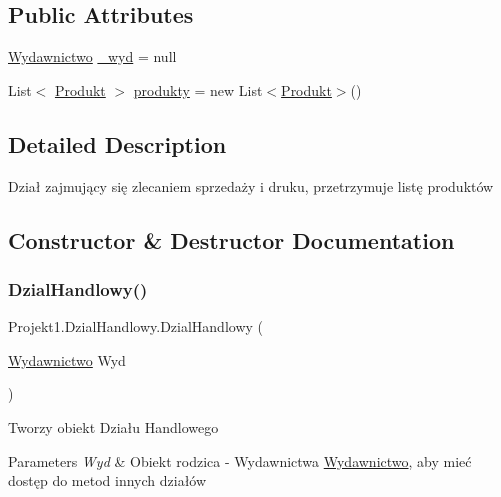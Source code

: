 \subsection*{Public Attributes}
\begin{DoxyCompactItemize}
\item 
\mbox{\hyperlink{class_projekt1_1_1_wydawnictwo}{Wydawnictwo}} \mbox{\hyperlink{class_projekt1_1_1_dzial_handlowy_a9fa7f63ee2ce0974a38f86cc1ef9c042}{\+\_\+wyd}} = null
\item 
List$<$ \mbox{\hyperlink{class_projekt1_1_1_produkt}{Produkt}} $>$ \mbox{\hyperlink{class_projekt1_1_1_dzial_handlowy_a72a83f1d777ad8acafc3e071d1fc64d7}{produkty}} = new List$<$\mbox{\hyperlink{class_projekt1_1_1_produkt}{Produkt}}$>$()
\end{DoxyCompactItemize}


\subsection{Detailed Description}
Dział zajmujący się zlecaniem sprzedaży i druku, przetrzymuje listę produktów 



\subsection{Constructor \& Destructor Documentation}
\mbox{\label{class_projekt1_1_1_dzial_handlowy_ad5c7110f56857cc32a3dfaf0811d72a4}} 
\subsubsection{\texorpdfstring{DzialHandlowy()}{DzialHandlowy()}}
{\footnotesize\ttfamily Projekt1.\+Dzial\+Handlowy.\+Dzial\+Handlowy (\begin{DoxyParamCaption}\item[{\mbox{\hyperlink{class_projekt1_1_1_wydawnictwo}{Wydawnictwo}}}]{Wyd }\end{DoxyParamCaption})}



Tworzy obiekt Działu Handlowego 


\begin{DoxyParams}{Parameters}
{\em Wyd} & Obiekt rodzica -\/ Wydawnictwa \mbox{\hyperlink{class_projekt1_1_1_wydawnictwo}{Wydawnictwo}}, aby mieć dostęp do metod innych działów \\
\hline
\end{DoxyParams}


